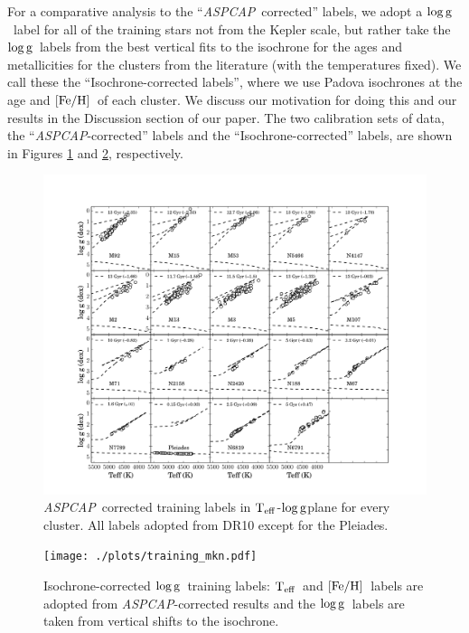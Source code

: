 \documentclass[12pt, preprint]{aastex}
\newcommand{\teff}{\mbox{$\rm T_{eff}$}}
\newcommand{\feh}{\mbox{$\rm [Fe/H]$}}
\newcommand{\logg}{\mbox{$\rm \log g$}}
\newcommand{\aspcap}{\textsl{ASPCAP}}
\begin{document}
For a comparative analysis to the ``\aspcap\ corrected'' labels, we adopt a \logg\ label for all of the training stars not from the Kepler scale, but rather take the \logg\ labels from the best vertical fits to the isochrone for the ages and metallicities for the clusters from the literature (with the temperatures fixed). We call these the ``Isochrone-corrected labels'', where we use Padova isochrones at the age and \feh\ of each cluster. We discuss our motivation for doing this and our results in the Discussion section of our paper.  The two calibration sets of data, the ``\aspcap-corrected'' labels and the ``Isochrone-corrected'' labels, are shown in Figures \ref{fig:trainingaspcap} and \ref{fig:trainingisochrone}, respectively. 

\begin{figure}[h!]
\centering
    \includegraphics[scale=0.33]{./plots/training_aspcap.pdf}
\caption{\aspcap\ corrected training labels in \teff-\logg plane for every cluster. All labels adopted from DR10 except for the Pleiades. }
\label{fig:trainingaspcap}
\end{figure}

\begin{figure}[h!]
\centering
  \texttt{[image: ./plots/training\_mkn.pdf]}
\caption{Isochrone-corrected \logg\ training labels: \teff\ and \feh\ labels are adopted from \aspcap-corrected results and the \logg\ labels are taken from vertical shifts to the isochrone. }
\label{fig:trainingisochrone}
\end{figure}
\end{document}
